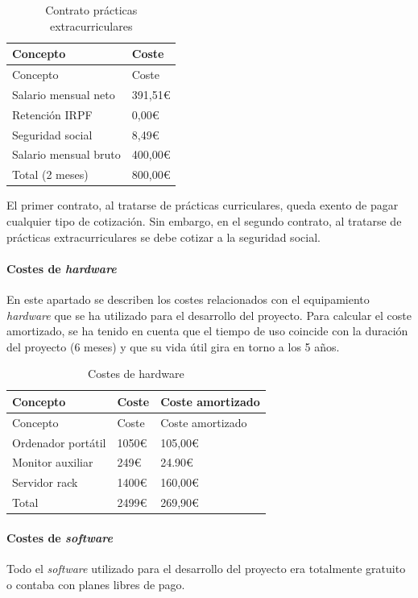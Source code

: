 \documentclass[
]{article}
\begin{document}
\begin{longtable}[]{@{}ll@{}}
\caption{Contrato prácticas extracurriculares}\tabularnewline
\toprule
Concepto & Coste\tabularnewline
\midrule
\endfirsthead
\toprule
Concepto & Coste\tabularnewline
\midrule
\endhead
Salario mensual neto & 391,51€\tabularnewline
Retención IRPF & 0,00€\tabularnewline
Seguridad social & 8,49€\tabularnewline
Salario mensual bruto & 400,00€\tabularnewline
Total (2 meses) & 800,00€\tabularnewline
\bottomrule
\end{longtable}

El primer contrato, al tratarse de prácticas curriculares, queda exento
de pagar cualquier tipo de cotización. Sin embargo, en el segundo
contrato, al tratarse de prácticas extracurriculares se debe cotizar a
la seguridad social.

\hypertarget{costes-de-hardware}{%
\paragraph{\texorpdfstring{Costes de
\emph{hardware}}{Costes de hardware}}\label{costes-de-hardware}}

En este apartado se describen los costes relacionados con el
equipamiento \emph{hardware} que se ha utilizado para el desarrollo del
proyecto. Para calcular el coste amortizado, se ha tenido en cuenta que
el tiempo de uso coincide con la duración del proyecto (6 meses) y que
su vida útil gira en torno a los 5 años.

\begin{longtable}[]{@{}lll@{}}
\caption{Costes de hardware}\tabularnewline
\toprule
Concepto & Coste & Coste amortizado\tabularnewline
\midrule
\endfirsthead
\toprule
Concepto & Coste & Coste amortizado\tabularnewline
\midrule
\endhead
Ordenador portátil & 1050€ & 105,00€\tabularnewline
Monitor auxiliar & 249€ & 24.90€\tabularnewline
Servidor rack & 1400€ & 160,00€\tabularnewline
Total & 2499€ & 269,90€\tabularnewline
\bottomrule
\end{longtable}

\hypertarget{costes-de-software}{%
\paragraph{\texorpdfstring{Costes de
\emph{software}}{Costes de software}}\label{costes-de-software}}

Todo el \emph{software} utilizado para el desarrollo del proyecto era
totalmente gratuito o contaba con planes libres de pago.
\end{document}
